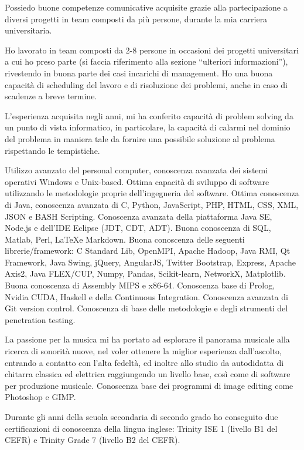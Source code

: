 \documentclass[helvetica,italian,logo,notitle,totpages,utf8]{europecv2013}
\newcommand{\tra}[1]{``#1''} %
\begin{document}
\begin{europecv}
\ecvlanguageheader
{}


\ecvlanguagefooter[5pt]

{
Possiedo buone competenze comunicative acquisite grazie alla partecipazione a diversi progetti in team composti da più persone, durante la mia carriera universitaria.
}

{
Ho lavorato in team composti da 2-8 persone in occasioni dei progetti universitari a cui ho preso parte (si faccia riferimento alla sezione \tra{ulteriori informazioni}), rivestendo in buona parte dei casi incarichi di management. Ho una buona capacità di scheduling del lavoro e di risoluzione dei problemi, anche in caso di scadenze a breve termine.
}

{
L'esperienza acquisita negli anni, mi ha conferito capacità di problem solving da un punto di vista informatico, in particolare, la capacità di calarmi nel dominio del problema in maniera tale da fornire una possibile soluzione al problema rispettando le tempistiche. 
}

{
Utilizzo avanzato del personal computer, conoscenza avanzata dei sistemi operativi Windows e Unix-based. Ottima capacità di sviluppo di software utilizzando le metodologie proprie dell'ingegneria del software. Ottima conoscenza  di Java, conoscenza avanzata di C, Python, JavaScript, PHP, HTML, CSS, XML, JSON e BASH Scripting. Conoscenza avanzata della piattaforma Java SE, Node.js e dell'IDE Eclipse (JDT, CDT, ADT). Buona conoscenza di SQL, Matlab, Perl, \LaTeX e Markdown. Buona conoscenza delle seguenti librerie/framework: C Standard Lib, OpenMPI, Apache Hadoop, Java RMI, Qt Framework, Java Swing, jQuery, AngularJS, Twitter Bootstrap, Express, Apache Axis2, Java FLEX/CUP, Numpy, Pandas, Scikit-learn, NetworkX, Matplotlib. Buona conoscenza di Assembly MIPS e x86-64. Conoscenza base di Prolog, Nvidia CUDA, Haskell e della Continuous Integration. Conoscenza avanzata di Git version control. Conoscenza di base delle metodologie e degli strumenti del penetration testing.
}


{
La passione per la musica mi ha portato ad esplorare il panorama musicale alla ricerca di sonorità nuove, nel voler ottenere la miglior esperienza dall'ascolto, entrando a contatto con l'alta fedeltà, ed inoltre allo studio da autodidatta di chitarra classica ed elettrica raggiungendo un livello base, così come di software per produzione musicale. Conoscenza base dei programmi di image editing come Photoshop e GIMP.
{\par\vspace{3pt}
Durante gli anni della scuola secondaria di secondo grado ho conseguito due certificazioni di conoscenza della lingua inglese: Trinity ISE 1 (livello B1 del CEFR) e Trinity Grade 7 (livello B2 del CEFR).
}
}




\end{europecv}
\end{document}
